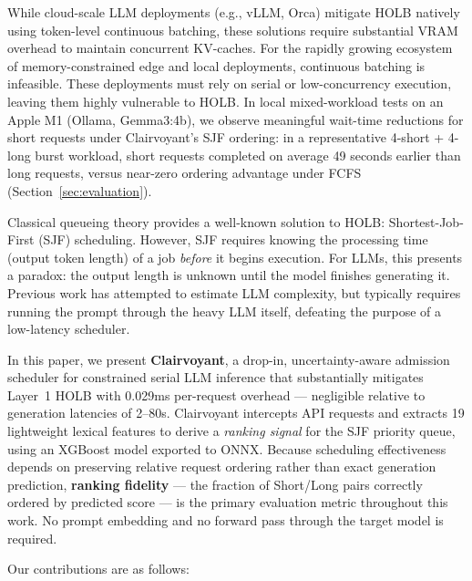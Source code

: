 \documentclass[10pt,letterpaper]{article}
\begin{document}
While cloud-scale LLM deployments (e.g., vLLM, Orca) mitigate HOLB natively using token-level continuous batching, these solutions require substantial VRAM overhead to maintain concurrent KV-caches. For the rapidly growing ecosystem of memory-constrained edge and local deployments, continuous batching is infeasible. These deployments must rely on serial or low-concurrency execution, leaving them highly vulnerable to HOLB. In local mixed-workload tests on an Apple M1 (Ollama, Gemma3:4b), we observe meaningful wait-time reductions for short requests under Clairvoyant's SJF ordering: in a representative 4-short + 4-long burst workload, short requests completed on average 49 seconds earlier than long requests, versus near-zero ordering advantage under FCFS (Section~\ref{sec:evaluation}).

Classical queueing theory provides a well-known solution to HOLB: Shortest-Job-First (SJF) scheduling. However, SJF requires knowing the processing time (output token length) of a job \textit{before} it begins execution. For LLMs, this presents a paradox: the output length is unknown until the model finishes generating it. Previous work has attempted to estimate LLM complexity, but typically requires running the prompt through the heavy LLM itself, defeating the purpose of a low-latency scheduler.

In this paper, we present \textbf{Clairvoyant}, a drop-in, uncertainty-aware admission scheduler for constrained serial LLM inference that substantially mitigates Layer~1 HOLB with 0.029ms per-request overhead --- negligible relative to generation latencies of 2--80s. Clairvoyant intercepts API requests and extracts 19 lightweight lexical features to derive a \emph{ranking signal} for the SJF priority queue, using an XGBoost model exported to ONNX. Because scheduling effectiveness depends on preserving relative request ordering rather than exact generation prediction, \textbf{ranking fidelity} --- the fraction of Short/Long pairs correctly ordered by predicted score --- is the primary evaluation metric throughout this work. No prompt embedding and no forward pass through the target model is required.

Our contributions are as follows:
\end{document}
